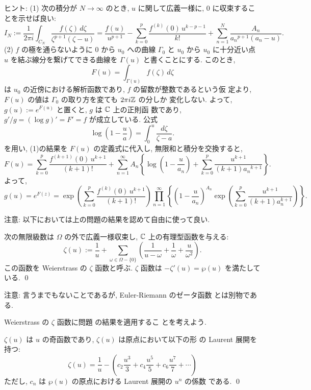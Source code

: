 \documentclass[12pt,twoside]{jarticle}
\def\setminus{-}
\def\pe{\wp}
\def\Z{{\Bbb Z}} %
\def\C{{\Bbb C}} %
\begin{document}
\noindent%
ヒント: (1) 次の積分が $N\to\infty$ のとき, $u$ に関して広義一様に, %
$0$ に収束することを示せば良い:
\[
  I_N
  :=
  \frac{1}{2\pi i}
  \int_{C_N} \frac{f(\zeta)\,d\zeta}{\zeta^{p+1}(\zeta - u)}
  =
  \frac{f(u)}{u^{p+1}}
  - \sum_{k=0}^p \frac{f^{(k)}(0)\,u^{k-p-1}}{k!} 
  + \sum_{n=1}^N \frac{A_n}{{a_n}^{p+1}(a_n - u)}.
\]
(2) $f$ の極を通らないように $0$ から $u_0$ への曲線 $\Gamma_0$ と %
$u_0$ から $u_0$ に十分近い点 $u$ を結ぶ線分を繋げてできる曲線を %
$\Gamma(u)$ と書くことにする. このとき,
\[
  F(u) = \int_{\Gamma(u)} f(\zeta)\,d\zeta
\] %
は $u_0$ の近傍における解析函数であり, $f$ の留数が整数であるという仮
定より, $F(u)$ の値は $\Gamma_0$ の取り方を変ても $2\pi i\Z$ の分しか
変化しない. よって, $g(u):=e^{F(u)}$ と置くと, $g$ は $\C$ 上の正則函
数であり, $g'/g=(\log g)'=F'=f$ が成立している. 公式
\[
  \log\left(1 - \frac{u}{a} \right)
  =
  \int_0^u \frac{d\zeta}{\zeta - a}.
\]
を用い, (1)の結果を $F(u)$ の定義式に代入し, 無限和と積分を交換すると,
\[
  F(u) = 
  \sum_{k=0}^{p} \frac{f^{(k+1)}(0)\,u^{k+1}}{(k+1)!}
  + \sum_{n=1}^\infty A_n
  \left\{
    \log\left( 1 - \frac{u}{a_n} \right) +
    \sum_{k=0}^p\frac{u^{k+1}}{(k+1){a_n}^{k+1}}
  \right\}.
\]
よって, 
\[
  g(u) = e^{F(z)} =
      \exp\left(
        \sum_{k=0}^{p} \frac{f^{(k)}(0)\,u^{k+1}}{(k+1)!}
      \right)
      \prod_{n=1}^\infty
      \left\{
        \left(1 - \frac{u}{a_n}\right)^{A_n}
        \exp\left( \sum_{k=0}^p \frac{u^{k+1}}{(k+1)a_n^{k+1}} \right)
      \right\}.
\]

\medskip

\noindent 注意: 以下においては上の問題の結果を認めて自由に使って良い.

\medskip

\begin{question}\label{q:pe2}
  次の無限級数は $\Omega$ の外で広義一様収束し,
  $\C$ 上の有理型函数を与える:
  \[
    \zeta(u) := 
    \frac{1}{u} +
    \sum_{\omega\in\Omega\setminus\{0\}}
    \left(
      \frac{1}{u-\omega} + \frac{1}{\omega} + \frac{u}{\omega^2}
    \right).
  \]
  この函数を Weierstrass の $\zeta$ 函数と呼ぶ. 
  $\zeta$ 函数は $-\zeta'(u)=\pe(u)$ を満たしている. \qed
\end{question}

\noindent 注意: 言うまでもないことであるが, Euler-Riemann のゼータ函数
とは別物である.

\medskip

Weierstrass の $\zeta$ 函数に問題  の結果を適用するこ
とを考えよう.

\begin{question}
  $\zeta(u)$ は $u$ の奇函数であり, $\zeta(u)$ は原点において以下の形
  の Laurent 展開を持つ:
  \[
    \zeta(u) = 
    \frac{1}{u} -
    \left(
    c_2 \frac{u^3}{3} + c_4 \frac{u^5}{5} + c_6 \frac{u^7}{7} + \cdots
    \right)
  \]
  ただし, $c_n$ は $\pe(u)$ の原点における Laurent 展開の $u^n$ の係数
  である. \qed
\end{question}
\end{document}
